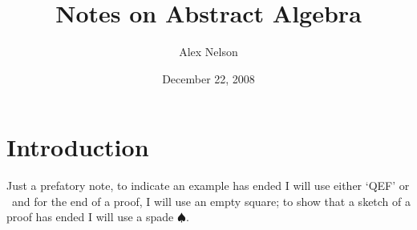 \documentclass[10pt,draft]{article}
\title{Notes on Abstract Algebra}
\author{Alex Nelson}
\date{December 22, 2008}
\def\slug{\hbox{\kern1.5pt\vrule width2.5pt height6pt depth1.5pt\kern1.5pt}}
\let\qef=\slug
\begin{document}
\maketitle
\tableofcontents
\listoffigures
\section*{Introduction}
\begin{rmk}
Just a prefatory note, to indicate an example has ended I
will use either `QEF' or \qef ~and for the end of a proof, I
will use an empty square; to show that a sketch of a proof
has ended I will use a spade $\spadesuit$.
\end{rmk}

\nocite{*}


\end{document}

